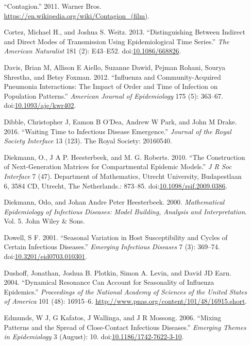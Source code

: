 \documentclass[]{book}
\theoremstyle{definition}
\theoremstyle{definition}
\theoremstyle{definition}
\theoremstyle{remark}
\begin{document}
\hypertarget{ref-contagionmovie}{}
``Contagion.'' 2011. Warner Bros.
\url{https://en.wikipedia.org/wiki/Contagion_(film)}.

\hypertarget{ref-cortez13}{}
Cortez, Michael H., and Joshua S. Weitz. 2013. ``Distinguishing Between
Indirect and Direct Modes of Transmission Using Epidemiological Time
Series.'' \emph{The American Naturalist} 181 (2): E43--E52.
doi:\href{https://doi.org/10.1086/668826}{10.1086/668826}.

\hypertarget{ref-davis12}{}
Davis, Brian M, Allison E Aiello, Suzanne Dawid, Pejman Rohani, Sourya
Shrestha, and Betsy Foxman. 2012. ``Influenza and Community-Acquired
Pneumonia Interactions: The Impact of Order and Time of Infection on
Population Patterns.'' \emph{American Journal of Epidemiology} 175 (5):
363--67.
doi:\href{https://doi.org/10.1093/aje/kwr402}{10.1093/aje/kwr402}.

\hypertarget{ref-dibble16}{}
Dibble, Christopher J, Eamon B O'Dea, Andrew W Park, and John M Drake.
2016. ``Waiting Time to Infectious Disease Emergence.'' \emph{Journal of
the Royal Society Interface} 13 (123). The Royal Society: 20160540.

\hypertarget{ref-diekmann10}{}
Diekmann, O., J A P. Heesterbeek, and M. G. Roberts. 2010. ``The
Construction of Next-Generation Matrices for Compartmental Epidemic
Models.'' \emph{J R Soc Interface} 7 (47). Department of Mathematics,
Utrecht University, Budapestlaan 6, 3584 CD, Utrecht, The Netherlands.:
873--85.
doi:\href{https://doi.org/10.1098/rsif.2009.0386}{10.1098/rsif.2009.0386}.

\hypertarget{ref-diekmann00}{}
Diekmann, Odo, and Johan Andre Peter Heesterbeek. 2000.
\emph{Mathematical Epidemiology of Infectious Diseases: Model Building,
Analysis and Interpretation}. Vol. 5. John Wiley \& Sons.

\hypertarget{ref-dowell01}{}
Dowell, S F. 2001. ``Seasonal Variation in Host Susceptibility and
Cycles of Certain Infectious Diseases.'' \emph{Emerging Infectious
Diseases} 7 (3): 369--74.
doi:\href{https://doi.org/10.3201/eid0703.010301}{10.3201/eid0703.010301}.

\hypertarget{ref-dushoff04}{}
Dushoff, Jonathan, Joshua B. Plotkin, Simon A. Levin, and David JD Earn.
2004. ``Dynamical Resonance Can Account for Seasonality of Influenza
Epidemics.'' \emph{Proceedings of the National Academy of Sciences of
the United States of America} 101 (48): 16915--6.
\url{http://www.pnas.org/content/101/48/16915.short}.

\hypertarget{ref-edmunds06}{}
Edmunds, W J, G Kafatos, J Wallinga, and J R Mossong. 2006. ``Mixing
Patterns and the Spread of Close-Contact Infectious Diseases.''
\emph{Emerging Themes in Epidemiology} 3 (August): 10.
doi:\href{https://doi.org/10.1186/1742-7622-3-10}{10.1186/1742-7622-3-10}.
\end{document}

